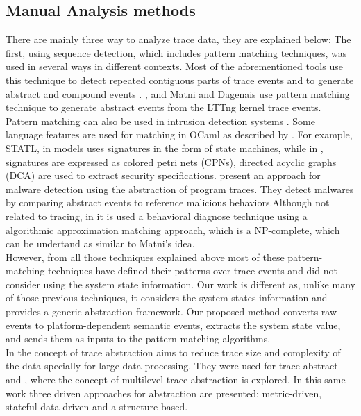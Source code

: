\subsection{Manual Analysis methods}
There are mainly three way to analyze trace data, they are explained below:
The first, using sequence detection, which includes pattern matching techniques, was used in several ways in different contexts. Most of the aforementioned tools use this technique to detect repeated contiguous parts of trace events and to generate abstract and compound events \cite{Pinpoint}. \cite{Fadel}, and Matni and Dagenais \cite{matni} use pattern matching technique to generate abstract events from the LTTng kernel trace events. Pattern matching can also be used in intrusion detection systems \cite{pattern_matching_intrusion}. Some language features are used for matching in OCaml as described by \cite{ocaml}.
For example, STATL, in \cite{statl} models uses signatures in the form of state machines, while in \cite{tracecompass}, signatures are expressed as colored petri nets (CPNs), directed acyclic graphs (DCA) are used to extract security specifications. \cite{behavior_abstraction} present an approach for malware detection using the abstraction of program traces. They detect malwares by comparing abstract events to reference malicious behaviors.Although not related to tracing, in \cite{Fredrikson2011} it is used a behavioral diagnose technique using a algorithmic approximation matching approach, which is a NP-complete, which can be undertand as similar to Matni's idea. \\
However, from all those techniques explained above most of these pattern-matching techniques have defined their patterns over trace events and did not consider using the system state information. Our work is different as, unlike many of those previous techniques, it considers the system states information and provides a generic abstraction framework. Our proposed method converts raw events to platform-dependent semantic events, extracts the system state value, and sends them as inputs to the pattern-matching algorithms.\\
In \cite{naser_abstraction} the concept of trace abstraction aims to reduce trace size and complexity of the data specially for large data processing. They were used for trace abstract \cite{trace_abstraction_1} and \cite{trace_abstraction_2}, where the concept of multilevel trace abstraction is explored. In this same work three driven approaches for abstraction are presented: metric-driven, stateful data-driven and a structure-based. \\
